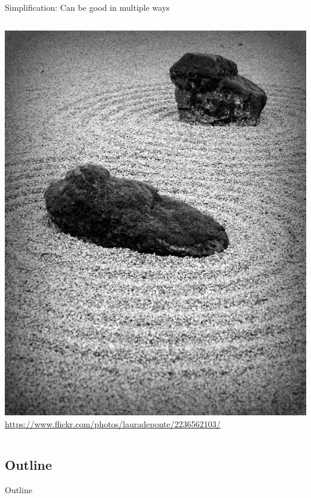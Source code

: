\documentclass{beamer}
\begin{document}
\begin{frame}{Simplification: Can be good in multiple ways}
\begin{columns}
\begin{column}{0.4\textwidth}
\begin{overprint}
\begin{center}
		\includegraphics[height=0.7\textheight]{Illustrations/zen.jpg} \\
		\tiny \url{https://www.flickr.com/photos/lauradeponte/2236562103/}
		\end{center} 
	\end{overprint}
\end{column}
\end{columns}


\end{frame}

\subsection*{Outline}

\begin{frame}{Outline}
  \tableofcontents[hideallsubsections]
\end{frame}

\end{document}
